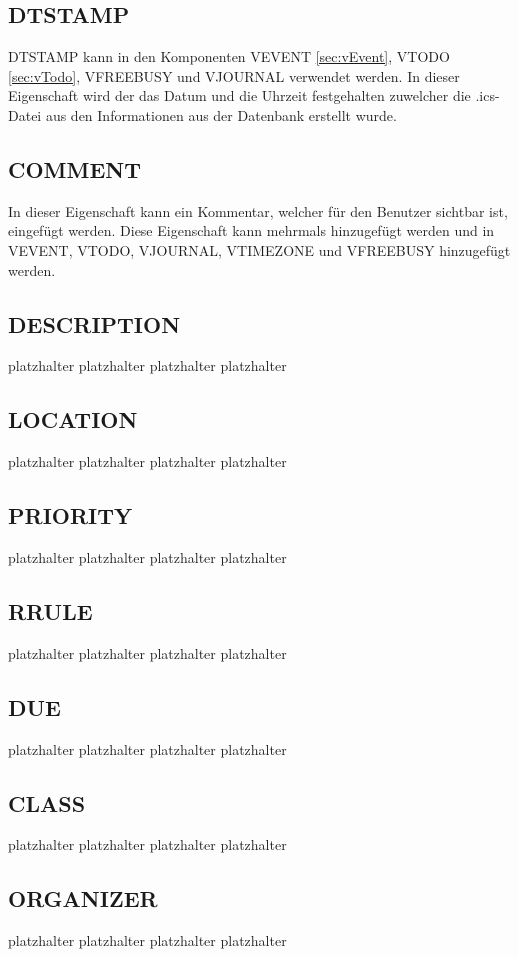 \subsection{DTSTAMP}
\label{sec:dtstamp}
DTSTAMP kann in den Komponenten VEVENT \ref{sec:vEvent}, VTODO \ref{sec:vTodo}, VFREEBUSY und VJOURNAL verwendet werden. In dieser Eigenschaft wird der das Datum und die Uhrzeit festgehalten zuwelcher die .ics-Datei aus den Informationen aus der Datenbank erstellt wurde.
\subsection{COMMENT}
\label{sec:comment}
In dieser Eigenschaft kann ein Kommentar, welcher für den Benutzer sichtbar ist, eingefügt werden. Diese Eigenschaft kann mehrmals hinzugefügt werden und in VEVENT, VTODO, VJOURNAL, VTIMEZONE und VFREEBUSY hinzugefügt werden.
\subsection{DESCRIPTION}
\label{sec:description}
platzhalter platzhalter platzhalter platzhalter 
\subsection{LOCATION}
\label{sec:location}
platzhalter platzhalter platzhalter platzhalter 
\subsection{PRIORITY}
\label{sec:priority}
platzhalter platzhalter platzhalter platzhalter 
\subsection{RRULE}
\label{sec:rrule}
platzhalter platzhalter platzhalter platzhalter 
\subsection{DUE}
\label{sec:due}
platzhalter platzhalter platzhalter platzhalter 
\subsection{CLASS}
\label{sec:class}
platzhalter platzhalter platzhalter platzhalter 
\subsection{ORGANIZER}
\label{sec:organizer}
platzhalter platzhalter platzhalter platzhalter 
